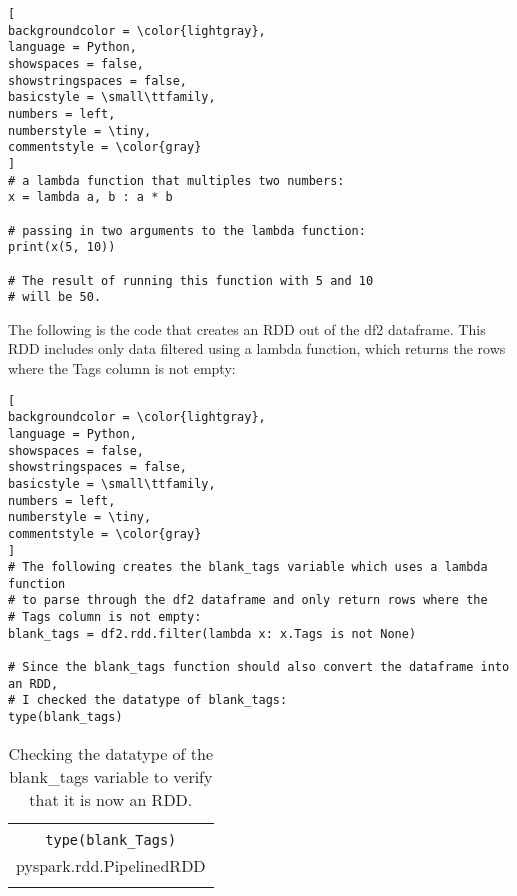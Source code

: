 \documentclass[]{article}
\newcommand{\code}[1]{\colorbox{light-gray}{\texttt{#1}}}
\begin{document}
\begin{lstlisting}[
backgroundcolor = \color{lightgray},
language = Python,
showspaces = false,
showstringspaces = false,
basicstyle = \small\ttfamily,
numbers = left,
numberstyle = \tiny,
commentstyle = \color{gray}
]
# a lambda function that multiples two numbers:
x = lambda a, b : a * b

# passing in two arguments to the lambda function:
print(x(5, 10))

# The result of running this function with 5 and 10
# will be 50.
\end{lstlisting}
The following is the code that creates an RDD out of the df2 dataframe.  This RDD includes only data filtered using a lambda function, which returns the rows where the Tags column is not empty:
\begin{lstlisting}[
backgroundcolor = \color{lightgray},
language = Python,
showspaces = false,
showstringspaces = false,
basicstyle = \small\ttfamily,
numbers = left,
numberstyle = \tiny,
commentstyle = \color{gray}
]
# The following creates the blank_tags variable which uses a lambda function
# to parse through the df2 dataframe and only return rows where the 
# Tags column is not empty:
blank_tags = df2.rdd.filter(lambda x: x.Tags is not None)

# Since the blank_tags function should also convert the dataframe into an RDD,
# I checked the datatype of blank_tags:
type(blank_tags)
\end{lstlisting}

\begin{table}[!ht]
	\begin{center}
		\caption{Checking the datatype of the blank\_tags variable to verify that it is now an RDD.}
		\label{tab:table1}
		\begin{tabular}{|c|} 
			\hline
			\\
			\code{type(blank\_Tags)}\\
			\hline
			pyspark.rdd.PipelinedRDD\\
			\\
			\hline
		\end{tabular}
	\end{center}
\end{table}
\end{document}

